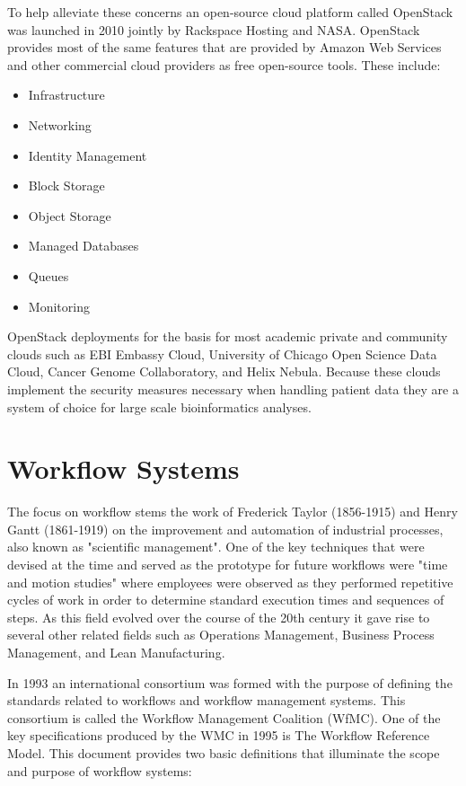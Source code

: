 To help alleviate these concerns an open-source cloud platform called OpenStack was launched in 2010 jointly by Rackspace Hosting and NASA\autocite{sefraoui2012openstack}. OpenStack provides most of the same features that are provided by Amazon Web Services and other commercial cloud providers as free open-source tools. These include:

\begin{itemize}
\item Infrastructure
\item Networking
\item Identity Management
\item Block Storage
\item Object Storage
\item Managed Databases
\item Queues
\item Monitoring
\end{itemize}

OpenStack deployments for the basis for most academic private and community clouds such as EBI Embassy Cloud\autocite{cook2016european}, University of Chicago Open Science Data Cloud\autocite{grossman2010overview}, Cancer Genome Collaboratory\autocite{yung2016icgc}, and Helix Nebula\autocite{marx2013biology}. Because these clouds implement the security measures necessary when handling patient data they are a system of choice for large scale bioinformatics analyses.
\newpage
\section{Workflow Systems}

The focus on workflow stems the work of Frederick Taylor (1856-1915) and Henry Gantt (1861-1919) on the improvement and automation of industrial processes, also known as "scientific management"\autocite{taylor2004scientific}. One of the key techniques that were devised at the time and served as the prototype for future workflows were "time and motion studies"\autocite{barnes1949motion} where employees were observed as they performed repetitive cycles of work in order to determine standard execution times and sequences of steps. As this field evolved over the course of the 20th century it gave rise to several other related fields such as Operations Management, Business Process Management, and Lean Manufacturing.

In 1993 an international consortium was formed with the purpose of defining the standards related to workflows and workflow management systems. This consortium is called the Workflow Management Coalition (WfMC). One of the key specifications produced by the WMC in 1995 is The Workflow Reference Model\autocite{hollingsworth1995workflow}. This document provides two basic definitions that illuminate the scope and purpose of  workflow systems:

